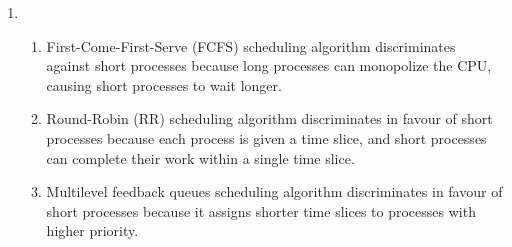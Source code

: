 \documentclass{article}
\begin{document}
\begin{enumerate}
	\item
	      \begin{enumerate}
		      \item First-Come-First-Serve (FCFS) scheduling algorithm discriminates against short processes because long processes can monopolize the CPU, causing short processes to wait longer.
		      \item Round-Robin (RR) scheduling algorithm discriminates in favour of short processes because each process is given a time slice, and short processes can complete their work within a single time slice.
		      \item Multilevel feedback queues scheduling algorithm discriminates in favour of short processes because it assigns shorter time slices to processes with higher priority.
	      \end{enumerate}
\end{enumerate}
\end{document}
